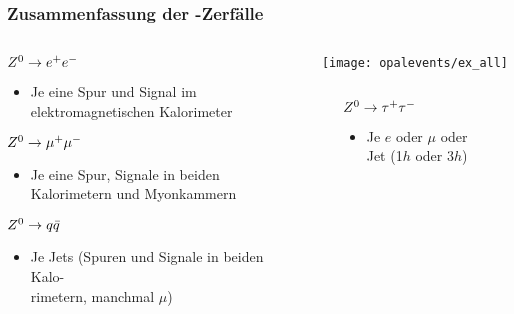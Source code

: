  \begin{frame}
   \frametitle{Zusammenfassung der \znull-Zerf\"alle}
   \begin{columns}
     \begin{column}{0.4\textwidth}
       \begin{block}{$Z^{0}\rightarrow e^{+}e^{-}$}
         \begin{itemize}
         \item Je eine Spur und Signal im elektromagnetischen Kalorimeter
         \end{itemize}
       \end{block}
       \begin{block}{$Z^{0}\rightarrow \mu^{+}\mu^{-}$}
         \begin{itemize}
         \item Je eine Spur, Signale in beiden Kalorimetern und Myonkammern
         \end{itemize}
       \end{block}
       \begin{block}{$Z^{0}\rightarrow q\bar{q}$}
         \begin{itemize}
         \item Je Jets (Spuren und Signale in beiden Kalo-\\rimetern,
           manchmal $\mu$)
         \end{itemize}
       \end{block}
    \end{column}
     \begin{column}{0.6\textwidth}
       \centering
       \texttt{[image: opalevents/ex\_all]}
       \vskip0.2cm
       \begin{columns}
         \begin{column}{0.05\textwidth}
         \end{column}
         \begin{column}{0.9\textwidth}
           \begin{block}{$Z^{0}\rightarrow \tau^{+}\tau^{-}$}
             \begin{itemize}
             \item Je $e$ oder $\mu$ oder Jet (1$h$ oder 3$h$)
             \end{itemize}
           \end{block}
         \end{column}
         \begin{column}{0.05\textwidth}
         \end{column}
       \end{columns}
     \end{column}
  \end{columns}
 \end{frame}
